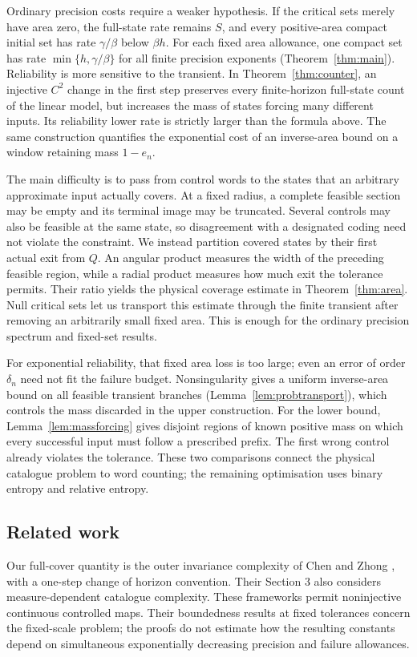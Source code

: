 \documentclass[11pt]{amsart}
\theoremstyle{definition}
\theoremstyle{remark}
\numberwithin{equation}{section}
\begin{document}
Ordinary precision costs require a weaker hypothesis. If the critical
sets merely have area zero, the full-state rate remains $S$, and
every positive-area compact initial set has rate $\gamma/\beta$
below $\beta h$. For each fixed area allowance, one compact set
has rate $\min\{h,\gamma/\beta\}$ for all finite precision exponents
(Theorem~\ref{thm:main}). Reliability is more sensitive to the
transient. In Theorem~\ref{thm:counter}, an injective $C^2$ change
in the first step preserves every finite-horizon full-state count
of the linear model, but increases the mass of states forcing many
different inputs. Its reliability lower rate is strictly larger
than the formula above. The same construction quantifies the
exponential cost of an inverse-area bound on a window retaining
mass $1-e_n$.

The main difficulty is to pass from control words to the states
that an arbitrary approximate input actually covers. At a fixed
radius, a complete feasible section may be empty and its terminal
image may be truncated. Several controls may also be feasible at
the same state, so disagreement with a designated coding need not
violate the constraint. We instead partition covered states by
their first actual exit from $Q$. An angular product measures the
width of the preceding feasible region, while a radial product
measures how much exit the tolerance permits. Their ratio yields
the physical coverage estimate in Theorem~\ref{thm:area}.
Null critical sets let us transport this estimate through the
finite transient after removing an arbitrarily small fixed area.
This is enough for the ordinary precision spectrum and fixed-set results.

For exponential reliability, that fixed area loss is too large;
even an error of order $\delta_n$ need not fit the failure budget.
Nonsingularity gives a uniform inverse-area bound on all feasible
transient branches (Lemma~\ref{lem:probtransport}), which controls
the mass discarded in the upper construction. For the lower bound,
Lemma~\ref{lem:massforcing} gives disjoint regions of known positive
mass on which every successful input must follow a prescribed prefix.
The first wrong control already violates the tolerance. These two
comparisons connect the physical catalogue problem to word counting;
the remaining optimisation uses binary entropy and relative entropy.

\subsection{Related work}
Our full-cover quantity is the outer invariance complexity of
Chen and Zhong \cite[Section 2.2]{CZ2024}, with a one-step change
of horizon convention. Their Section 3 also considers
measure-dependent catalogue complexity. These frameworks permit
noninjective continuous controlled maps. Their boundedness results
at fixed tolerances concern the fixed-scale problem; the proofs
do not estimate how the resulting constants depend on simultaneous
exponentially decreasing precision and failure allowances.
\end{document}
